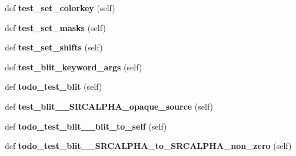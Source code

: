 \begin{DoxyCompactItemize}
\item 
\mbox{\label{classpygame_1_1tests_1_1surface__test_1_1_surface_type_test_a9861b09c501d1f2ffe8eaad0db598db6}} 
def {\bfseries test\+\_\+set\+\_\+colorkey} (self)
\item 
\mbox{\label{classpygame_1_1tests_1_1surface__test_1_1_surface_type_test_a86729a1894e9f4e67664ee3b42a775d0}} 
def {\bfseries test\+\_\+set\+\_\+masks} (self)
\item 
\mbox{\label{classpygame_1_1tests_1_1surface__test_1_1_surface_type_test_a6b0770872c5eaa5c2664dfc95203efab}} 
def {\bfseries test\+\_\+set\+\_\+shifts} (self)
\item 
\mbox{\label{classpygame_1_1tests_1_1surface__test_1_1_surface_type_test_a2a3e57dfe9ca1893af45afcad4de5858}} 
def {\bfseries test\+\_\+blit\+\_\+keyword\+\_\+args} (self)
\item 
\mbox{\label{classpygame_1_1tests_1_1surface__test_1_1_surface_type_test_a6df8d948f723f5db06099473fca461c3}} 
def {\bfseries todo\+\_\+test\+\_\+blit} (self)
\item 
\mbox{\label{classpygame_1_1tests_1_1surface__test_1_1_surface_type_test_aa5e50865177339625e9fc75b960d9980}} 
def {\bfseries test\+\_\+blit\+\_\+\+\_\+\+S\+R\+C\+A\+L\+P\+H\+A\+\_\+opaque\+\_\+source} (self)
\item 
\mbox{\label{classpygame_1_1tests_1_1surface__test_1_1_surface_type_test_a62f2bb458c66d2584542569a955734c9}} 
def {\bfseries todo\+\_\+test\+\_\+blit\+\_\+\+\_\+blit\+\_\+to\+\_\+self} (self)
\item 
\mbox{\label{classpygame_1_1tests_1_1surface__test_1_1_surface_type_test_acbbac1f70e48d07fde7132d027967aff}} 
def {\bfseries todo\+\_\+test\+\_\+blit\+\_\+\+\_\+\+S\+R\+C\+A\+L\+P\+H\+A\+\_\+to\+\_\+\+S\+R\+C\+A\+L\+P\+H\+A\+\_\+non\+\_\+zero} (self)

\end{DoxyCompactItemize}
